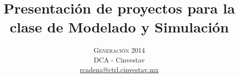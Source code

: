 



\title{\vspace{-15mm}\fontsize{24pt}{10pt}\selectfont\textbf{Presentación de proyectos para la clase de Modelado y Simulación}} %

\author{
\large \textsc{Generación 2014}\\[2mm] %
\normalsize DCA - Cinvestav \\ %
\normalsize \href{mailto:rcadena@ctrl.cinvestav.mx}{rcadena@ctrl.cinvestav.mx} %
\vspace{-5mm}
}
\date{}




    \maketitle %

    \thispagestyle{fancy} %



    \begin{multicols}{2} %

        


    \end{multicols}


